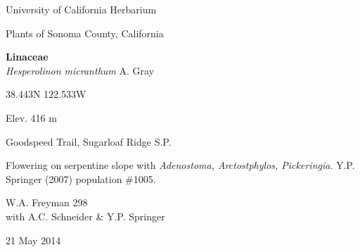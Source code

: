 \documentclass[letterpaper,10pt]{article}
\begin{document}
\begin{minipage}[t]{0.40\textwidth}

\begin{center}
University of California Herbarium \\
\begin{large}
Plants of Sonoma County, California \\
\end{large}
\vspace{\baselineskip}
\textbf{Linaceae} \\
\textit{Hesperolinon micranthum} A. Gray\\
\end{center}

\begin{footnotesize}

\begin{multicols}{2}
38.443\textdegree N 122.533\textdegree W
\columnbreak
\begin{flushright}
Elev. 416 m
\end{flushright}
\end{multicols}

Goodspeed Trail, Sugarloaf Ridge S.P.
\vspace{\baselineskip}

Flowering on serpentine slope with \textit{Adenostoma, Arctostphylos, Pickeringia}. Y.P. Springer (2007) population \#1005.

\begin{multicols}{2}
W.A. Freyman 298 \\
with A.C. Schneider \& Y.P. Springer
\columnbreak
\begin{flushright}
21 May 2014
\end{flushright}
\end{multicols}

\end{footnotesize}

\end{minipage}

\vspace{2cm}
%
%
\end{document}

